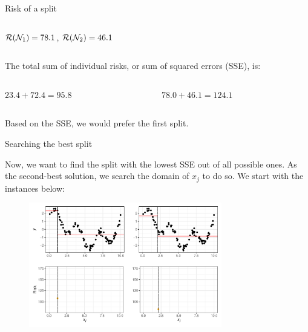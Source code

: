 \documentclass[11pt,compress,t,notes=noshow, xcolor=table]{beamer}
\begin{document}
\begin{vbframe}{Risk of a split}
\begin{columns}
\begin{column}{0.5\textwidth}
$\mathcal{R}(\mathcal{N}_1) = 78.1$, $\mathcal{R}(\mathcal{N}_2) = 46.1$

\end{column}
\end{columns}
\vspace{0.1in}

The total sum of individual risks, or sum of squared errors (SSE), is:
\vspace{0.1in}

\begin{columns}
\begin{column}{0.5\textwidth}
$23.4 + 72.4 = 95.8$
\end{column}

\begin{column}{0.5\textwidth}
$78.0 + 46.1 = 124.1$ 
\end{column}
\end{columns}

\vspace{0.1in}
Based on the SSE, we would prefer the first split.

\end{vbframe}

\begin{vbframe}{Searching the best split}

Now, we want to find the split with the lowest SSE out of all possible ones.
As the second-best solution, we search the domain of $x_j$ to do so.
We start with the instances below:

\begin{figure}
\includegraphics[width=0.75\textwidth]{figure/splitcrit_optimal-constant-grid.pdf} 
\end{figure}


\end{vbframe}
\end{document}

